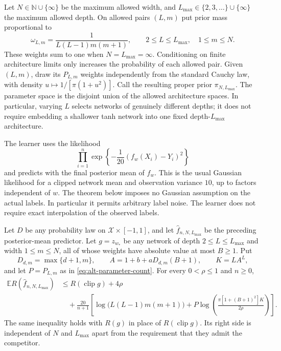 Let $N\in\mathbb N\cup\{\infty\}$ be the maximum allowed width, and
$L_{\max}\in\{2,3,\ldots\}\cup\{\infty\}$ the maximum allowed depth.  On
allowed pairs $(L,m)$ put prior mass proportional to
\begin{equation}
 \omega_{L,m}=\frac1{L(L-1)m(m+1)},
 \qquad 2\le L\le L_{\max},\quad 1\le m\le N.
 \label{eq:alt-architecture-weight}
\end{equation}
These weights sum to one when $N=L_{\max}=\infty$.  Conditioning on finite
architecture limits only increases the probability of each allowed
pair.  Given $(L,m)$, draw its $P_{L,m}$ weights independently from the
standard Cauchy law, with density $u\mapsto1/[\pi(1+u^2)]$.
Call the resulting proper prior $\pi_{N,L_{\max}}$.
The parameter space is the disjoint union of the allowed architecture
spaces.  In particular, varying $L$ selects networks of genuinely
different depths; it does not require embedding a shallower tanh
network into one fixed depth-$L_{\max}$ architecture.

The learner uses the likelihood
\begin{equation}
 \prod_{i=1}^n\exp\left\{-\frac1{20}
                  (f_w(X_i)-Y_i)^2\right\}
 \label{eq:alt-clipped-likelihood}
\end{equation}
and predicts with the final posterior mean of $f_w$.
This is the usual Gaussian likelihood for a clipped network mean and
observation variance $10$, up to factors independent of $w$.
The theorem below imposes no Gaussian assumption on the actual labels.
In particular it permits arbitrary label noise.  The learner does not
require exact interpolation of the observed labels.

\begin{theorem}
\label{thm:alt-nn-oracle}
Let $D$ be any probability law on $\mathcal X\times[-1,1]$, and let
$\widehat f_{n,N,L_{\max}}$ be the preceding posterior-mean predictor.  Let
$g=z_{w_*}$ be any network of depth $2\le L\le L_{\max}$ and width
$1\le m\le N$, all of whose weights have absolute value at most
$B\ge1$.  Put
\[
 D_{d,m}=\max\{d+1,m\},\qquad
 A=1+b+aD_{d,m}(B+1),\qquad K=L A^L,
\]
and let $P=P_{L,m}$ as in \eqref{eq:alt-parameter-count}.  For every
$0<\rho\le1$ and $n\ge0$,
\begin{align}
 \mathbb E R(\widehat f_{n,N,L_{\max}})
 &\le R(\operatorname{clip}g)+4\rho \\
 &\quad+\frac{20}{n+1}\left[
  \log\bigl(L(L-1)m(m+1)\bigr)
  +P\log\left(\frac{\pi[1+(B+1)^2]K}{2\rho}\right)
                              \right].
 \label{eq:alt-nn-bound}
\end{align}
The same inequality holds with $R(g)$ in place of
$R(\operatorname{clip}g)$.  Its right side is independent of $N$ and
$L_{\max}$ apart from the requirement that they admit the competitor.
\end{theorem}

